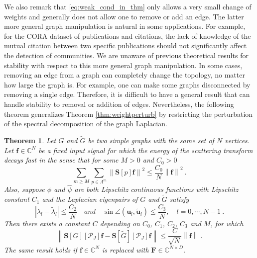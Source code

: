 \documentclass{article}
\newtheorem{theorem}{Theorem}[section]
\def\l{\lambda}
\def\CC{\mathbb{C}}
\def\cP{\mathcal{P}}
\def\tl{\tilde{\l}}
\def\tG{\tilde{G}}
\def\BF{\boldsymbol{F}}
\def\BS{\boldsymbol{S}}
\def\Bf{\boldsymbol{f}}
\def\Bu{\boldsymbol{u}}
\newcommand{\abs}[1]{\left| #1 \right|}
\newcommand{\norm}[1]{\left\lVert#1\right\rVert}
\begin{document}
{We also remark that \eqref{eq:weak_cond_in_thm} only allows a very small change of weights and generally does not allow one to remove or add an edge.} {The latter more general graph manipulation is natural in some applications. For example, for the CORA dataset \cite{SenNB08} of publications and citations, the lack of knowledge of the mutual citation between two specific publications should not significantly affect the detection of communities. We are unaware of previous theoretical results for stability with respect to this more general graph manipulation.}
{In some cases, removing an edge from a graph can completely change the topology, no matter how large the graph is. For example, one can make some graphs disconnected by removing a single edge. Therefore, it is difficult to have a general result that can handle stability to removal or addition of edges. Nevertheless, the following theorem generalizes Theorem \ref{thm:weightperturb} by restricting the perturbation of the spectral decomposition of the graph Laplacian.} 


\begin{theorem}\label{thm:forgeneral}
Let $G$ and $\tG$ be two simple graphs with the same set of $N$ vertices. Let $\Bf \in \CC^N$ be a fixed input signal for which the energy of the scattering transform decays fast in the sense that for some $M > 0$ and $C_0 > 0$ 
\begin{equation}
\sum_{m \geq M} \sum_{p \in \Lambda^m} \norm{\BS[p] \Bf}^2 \leq \frac{C_0}{N} \norm{\Bf}^2 ~.
\end{equation}
Also, suppose $\hat{\phi}$ and $\hat{\psi}$ are both Lipschitz continuous functions with Lipschitz constant $C_1$ and the Laplacian eigenpairs of $G$ and $\tG$ satisfy 
\begin{equation}\label{eq:eigenConditions}
\abs{\l_l - \tl_l} \leq \frac{C_2}{N} \quad and \quad \sin \angle (\Bu_l, \tilde{\Bu}_l) \leq \frac{C_3}{N},  \quad l = 0, \cdots, N-1 ~.
\end{equation}
Then there exists a constant $C$ depending on $C_0$, $C_1$, $C_2$, $C_3$ and $M$, for which
\begin{equation}\label{eq:stablegraph}
\norm{\BS[G][\cP_J]\Bf-\BS[\tG][\cP_J]\Bf} \leq \frac{C}{\sqrt{N}} \norm{\Bf} ~.
\end{equation}
The same result holds if $\Bf \in \CC^N$ is replaced with $\BF \in \CC^{N \times D}$.
\end{theorem}
\end{document}
